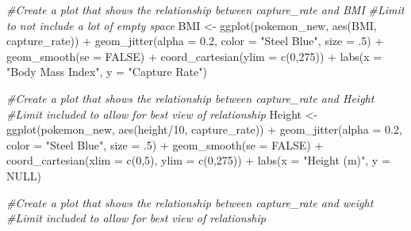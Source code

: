 \documentclass[
]{article}
\newenvironment{Shaded}{\begin{snugshade}}{\end{snugshade}}
\newcommand{\AttributeTok}[1]{\textcolor[rgb]{0.77,0.63,0.00}{#1}}
\newcommand{\CommentTok}[1]{\textcolor[rgb]{0.56,0.35,0.01}{\textit{#1}}}
\newcommand{\ConstantTok}[1]{\textcolor[rgb]{0.00,0.00,0.00}{#1}}
\newcommand{\DecValTok}[1]{\textcolor[rgb]{0.00,0.00,0.81}{#1}}
\newcommand{\FloatTok}[1]{\textcolor[rgb]{0.00,0.00,0.81}{#1}}
\newcommand{\FunctionTok}[1]{\textcolor[rgb]{0.00,0.00,0.00}{#1}}
\newcommand{\NormalTok}[1]{#1}
\newcommand{\OtherTok}[1]{\textcolor[rgb]{0.56,0.35,0.01}{#1}}
\newcommand{\SpecialCharTok}[1]{\textcolor[rgb]{0.00,0.00,0.00}{#1}}
\newcommand{\StringTok}[1]{\textcolor[rgb]{0.31,0.60,0.02}{#1}}
\begin{document}
\begin{Shaded}
\begin{Highlighting}[]
\CommentTok{\#Create a plot that shows the relationship between capture\_rate and BMI}
\CommentTok{\#Limit to not include a lot of empty space}
\NormalTok{BMI }\OtherTok{\textless{}{-}} \FunctionTok{ggplot}\NormalTok{(pokemon\_new, }\FunctionTok{aes}\NormalTok{(BMI, capture\_rate)) }\SpecialCharTok{+}
  \FunctionTok{geom\_jitter}\NormalTok{(}\AttributeTok{alpha =} \FloatTok{0.2}\NormalTok{, }\AttributeTok{color =} \StringTok{"Steel Blue"}\NormalTok{, }\AttributeTok{size =}\NormalTok{ .}\DecValTok{5}\NormalTok{) }\SpecialCharTok{+}
  \FunctionTok{geom\_smooth}\NormalTok{(}\AttributeTok{se =} \ConstantTok{FALSE}\NormalTok{) }\SpecialCharTok{+}
  \FunctionTok{coord\_cartesian}\NormalTok{(}\AttributeTok{ylim =} \FunctionTok{c}\NormalTok{(}\DecValTok{0}\NormalTok{,}\DecValTok{275}\NormalTok{)) }\SpecialCharTok{+}
  \FunctionTok{labs}\NormalTok{(}\AttributeTok{x =} \StringTok{"Body Mass Index"}\NormalTok{, }\AttributeTok{y =} \StringTok{"Capture Rate"}\NormalTok{)}


\CommentTok{\#Create a plot that shows the relationship between capture\_rate and Height}
\CommentTok{\#Limit included to allow for best view of relationship}
\NormalTok{Height }\OtherTok{\textless{}{-}} \FunctionTok{ggplot}\NormalTok{(pokemon\_new, }\FunctionTok{aes}\NormalTok{(height}\SpecialCharTok{/}\DecValTok{10}\NormalTok{, capture\_rate)) }\SpecialCharTok{+}
  \FunctionTok{geom\_jitter}\NormalTok{(}\AttributeTok{alpha =} \FloatTok{0.2}\NormalTok{, }\AttributeTok{color =} \StringTok{"Steel Blue"}\NormalTok{, }\AttributeTok{size =}\NormalTok{ .}\DecValTok{5}\NormalTok{) }\SpecialCharTok{+}
  \FunctionTok{geom\_smooth}\NormalTok{(}\AttributeTok{se =} \ConstantTok{FALSE}\NormalTok{) }\SpecialCharTok{+}
  \FunctionTok{coord\_cartesian}\NormalTok{(}\AttributeTok{xlim =} \FunctionTok{c}\NormalTok{(}\DecValTok{0}\NormalTok{,}\DecValTok{5}\NormalTok{), }\AttributeTok{ylim =} \FunctionTok{c}\NormalTok{(}\DecValTok{0}\NormalTok{,}\DecValTok{275}\NormalTok{)) }\SpecialCharTok{+}
  \FunctionTok{labs}\NormalTok{(}\AttributeTok{x =} \StringTok{"Height (m)"}\NormalTok{, }\AttributeTok{y =} \ConstantTok{NULL}\NormalTok{)}
  
\CommentTok{\#Create a plot that shows the relationship between capture\_rate and weight}
\CommentTok{\#Limit included to allow for best view of relationship}


\end{Highlighting}
\end{Shaded}
\end{document}
